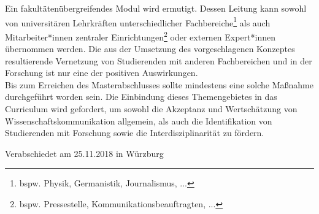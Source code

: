\documentclass[DIV=calc]{scrartcl}
\begin{document}
Ein fakultätenübergreifendes Modul wird ermutigt. Dessen Leitung kann sowohl von universitären Lehrkräften unterschiedlicher Fachbereiche\footnote{bspw. Physik, Germanistik, Journalismus, ...} als auch Mitarbeiter*innen zentraler Einrichtungen\footnote{bspw. Pressestelle, Kommunikationsbeauftragten, ...} oder externen Expert*innen übernommen werden. Die aus der Umsetzung des vorgeschlagenen Konzeptes resultierende Vernetzung von Studierenden mit anderen Fachbereichen und in der Forschung ist nur eine der positiven Auswirkungen. \\

Bis zum Erreichen des Masterabschlusses sollte mindestens eine solche Maßnahme durchgeführt worden sein. Die Einbindung dieses Themengebietes in das Curriculum wird gefordert, um sowohl die Akzeptanz und Wertschätzung von Wissenschaftskommunikation allgemein, als auch die Identifikation von Studierenden mit Forschung sowie die Interdisziplinarität zu fördern.
\vfill
    \begin{flushright}
        Verabschiedet am 25.11.2018 in Würzburg
    \end{flushright}
\end{document}
